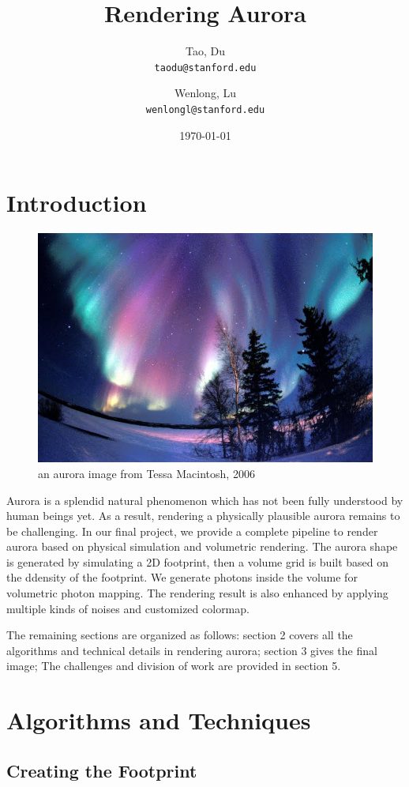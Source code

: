 \documentclass[10pt,a4paper]{article}
\title{\textbf{Rendering Aurora}}
\author{
	Tao, Du\\
	\texttt{taodu@stanford.edu}
	\and
	Wenlong, Lu\\
	\texttt{wenlongl@stanford.edu}
}
\date{\today}
\begin{document}
\maketitle

\section{Introduction}

\begin{figure}[h]
\centering
\includegraphics[width=0.7\linewidth]{./reference}
\caption{an aurora image from Tessa Macintosh, 2006}
\label{fig:reference}
\end{figure}

Aurora is a splendid natural phenomenon which has not been fully understood by human beings yet. As a result, rendering a physically plausible aurora remains to be challenging. In our final project, we provide a complete pipeline to render aurora based on physical simulation and volumetric rendering. The aurora shape is generated by simulating a 2D footprint, then a volume grid is built based on the ddensity of the footprint. We generate photons inside the volume for volumetric photon mapping. The rendering result is also enhanced by applying multiple kinds of noises and customized colormap.

The remaining sections are organized as follows: section 2 covers all the algorithms and technical details in rendering aurora; section 3 gives the final image; The challenges and division of work are provided in section 5.

\section{Algorithms and Techniques}

\subsection{Creating the Footprint}
\end{document}
